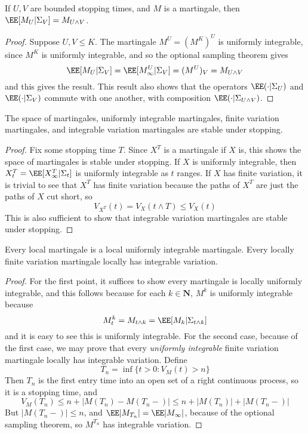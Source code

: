 \begin{lemma}
    If $U,V$ are bounded stopping times, and $M$ is a martingale, then $\EE[M_U|\Sigma_V] = M_{U \wedge V}$.
\end{lemma}
\begin{proof}
    Suppose $U,V \leq K$. The martingale $M^U = (M^K)^U$ is uniformly integrable, since $M^K$ is uniformly integrable, and so the optional sampling theorem gives
    \[ \EE[M_U|\Sigma_V] = \EE[M^U_\infty | \Sigma_V] = (M^U)_V = M_{U \wedge V} \]
    and this gives the result. This result also shows that the operators $\EE(\cdot | \Sigma_U)$ and $\EE(\cdot | \Sigma_V)$ commute with one another, with composition $\EE(\cdot | \Sigma_{U \wedge V})$.
\end{proof}

\begin{theorem}
    The space of martingales, uniformly integrable martingales, finite variation martingales, and integrable variation martingales are stable under stopping.
\end{theorem}
\begin{proof}
    Fix some stopping time $T$. Since $X^T$ is a martingale if $X$ is, this shows the space of martingales is stable under stopping. If $X$ is uniformly integrable, then $X^T_t = \EE[X^T_\infty|\Sigma_t]$ is uniformly integrable as $t$ ranges. If $X$ has finite variation, it is trivial to see that $X^T$ has finite variation because the paths of $X^T$ are just the paths of $X$ cut short, so
    \[ V_{X^T}(t) = V_X(t \wedge T) \leq V_X(t) \]
    This is also sufficient to show that integrable variation martingales are stable under stopping.
\end{proof}

\begin{lemma}
    Every local martingale is a local uniformly integrable martingale. Every locally finite variation martingale locally has integrable variation.
\end{lemma}
\begin{proof}
    For the first point, it suffices to show every martingale is locally uniformly integrable, and this follows because for each $k \in \mathbf{N}$, $M^k$ is uniformly integrable because
    \[ M^k_t = M_{t \wedge k} = \EE[M_k|\Sigma_{t \wedge k}] \]
    and it is easy to see this is uniformly integrable. For the second case, because of the first case, we may prove that every {\it uniformly integrable} finite variation martingale locally has integrable variation. Define
    \[ T_n = \inf \{ t > 0 : V_M(t) > n \} \]
    Then $T_n$ is the first entry time into an open set of a right continuous process, so it is a stopping time, and
    \[ V_M(T_n) \leq n + |M(T_n) - M(T_n-)| \leq n + |M(T_n)| + |M(T_n-)| \]
    But $|M(T_n-)| \leq n$, and $\EE |M_{T_n}| = \EE |M_\infty|$, because of the optional sampling theorem, so $M^{T_n}$ has integrable variation.
\end{proof}

